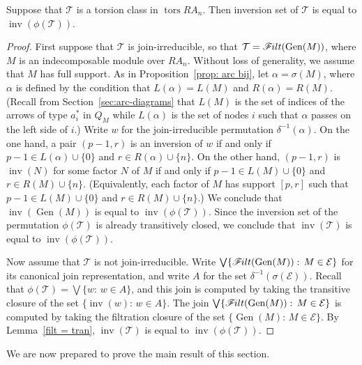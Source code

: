 \documentclass[ALCO,ThmDefs,Unicode,epreuves]{cedram}
\DeclareMathOperator{\tors}{tors}
\DeclareMathOperator{\inv}{inv}
\newcommand{\calE}{\mathcal{E}}
\newcommand{\calT}{\mathcal{T}}
\newcommand{\filt}{\mathscr{F}\Mk ilt}
\renewcommand{\Join}{\bigvee}
\newcommand{\Gen}{\operatorname{Gen}}
\renewcommand{\1}{\hat{1}}
\newcommand{\0}{\hat{0}}
\newcommand*{\Mk}{\mkern -2mu}
\begin{document}
\begin{proposition}\label{prop: inversion set}
Suppose that $\calT$ is a torsion class in $\tors RA_n$.
Then inversion set of $\calT$ is equal to $\inv(\phi(\calT))$.
\end{proposition}
 \begin{proof}
 First suppose that $\calT$ is join-irreducible, so that $\calT = \filt(\Gen(M))$, where $M$ is an indecomposable module over $RA_n$.
Without loss of generality, we assume that $M$ has full support.
As in Proposition~\ref{prop: arc bij}, let $\alpha= \sigma(M)$, where
$\alpha$ is defined by the condition that $L(\alpha)= L(M)$ and $R(\alpha)= R(M)$.
(Recall from Section~\ref{sec:arc-diagrams} that $L(M)$ is the set of
indices of the arrows of type $a_i^*$ in $Q_M$ while $L(\alpha)$ is
the set of nodes $i$ such that $\alpha$ passes on the left side of
$i$.)
Write $w$ for the join-irreducible permutation $\delta^{-1}(\alpha)$.
On the one hand, a pair $(p-1,r)$ is an inversion of $w$ if and only if $p-1\in L(\alpha) \cup \{0\}$ and $r\in R(\alpha)\cup \{n\}$.
On the other hand, $(p-1,r)$ is $\inv(N)$ for some factor $N$ of $M$ if and only if $p-1\in L(M) \cup \{0\}$ and $r\in R(M)\cup \{n\}$.
(Equivalently, each factor of $M$ has support $[p,r]$ such that $p-1\in L(M)\cup \{0\}$ and $r\in R(M)\cup \{n\}$.)
We conclude that $\inv(\Gen(M))$ is equal to $\inv(\phi(\calT))$.
Since the inversion set of the permutation $\phi(\calT)$ is already transitively closed, we conclude that $\inv(\calT)$ is equal to $\inv(\phi(\calT))$.

Now assume that $\calT$ is not join-irreducible.
Write $\Join \{\filt(\Gen(M)):\, M\in \calE\}$ for its canonical join representation, and write $A$ for the set $\delta^{-1}(\sigma(\calE))$.
Recall that $\phi(\calT) = \Join \{w:\, w\in A\}$, and this join is computed by taking the transitive closure of the set $\{\inv(w):\,w\in A\}$.
The join $\Join \{\filt(\Gen(M)):\,M\in \calE\}$ is computed by taking the filtration closure of the set $\{\Gen(M):\,M\in \calE\}$.
By Lemma~\ref{filt = tran}, $\inv(\calT)$ is equal to $\inv(\phi(\calT))$.
 \end{proof}

We are now prepared to prove the main result of this section.
\end{document}
